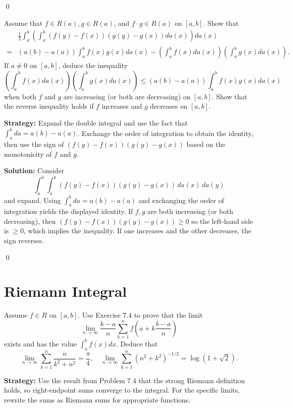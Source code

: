 \qed
\begin{problembox}
Assume that $f \in R(a), g \in R(a)$, and $f \cdot g \in R(a)$ on $[a, b]$. Show that
\begin{align*}
&\frac{1}{2} \int_a^b \left( \int_a^b (f(y) - f(x))(g(y) - g(x)) da(x) \right) da(x) \\
=& (a(b) - a(a)) \int_a^b f(x)g(x) da(x) - \left( \int_a^b f(x) da(x) \right) \left( \int_a^b g(x) da(x) \right).
\end{align*}
If $a \neq 0$ on $[a, b]$, deduce the inequality
\[\left( \int_a^b f(x) da(x) \right) \left( \int_a^b g(x) da(x) \right) \leq (a(b) - a(a)) \int_a^b f(x)g(x) da(x)\]
when both $f$ and $g$ are increasing (or both are decreasing) on $[a, b]$. Show that the reverse inequality holds if $f$ increases and $g$ decreases on $[a, b]$.
\end{problembox}

\noindent\textbf{Strategy:} Expand the double integral and use the fact that $\int_a^b da = a(b) - a(a)$. Exchange the order of integration to obtain the identity, then use the sign of $(f(y) - f(x))(g(y) - g(x))$ based on the monotonicity of $f$ and $g$.

\bigskip\noindent\textbf{Solution:}
Consider
\[\int_a^b\int_a^b (f(y)-f(x))(g(y)-g(x))\,da(x)\,da(y)\]
and expand. Using $\int_a^b da=a(b)-a(a)$ and exchanging the order of integration yields the displayed identity. If $f,g$ are both increasing (or both decreasing), then $(f(y)-f(x))(g(y)-g(x))\ge0$ so the left-hand side is $\ge0$, which implies the inequality. If one increases and the other decreases, the sign reverses.


\qed
\section{Riemann Integral}



\begin{problembox}
Assume $f \in R$ on $[a, b]$. Use Exercise 7.4 to prove that the limit 
\[\lim_{n \to \infty} \frac{b - a}{n} \sum_{k=1}^{n} f \left( a + k \frac{b - a}{n} \right)\]
exists and has the value $\int_a^b f(x) dx$. Deduce that 
\[\lim_{n \to \infty} \sum_{k=1}^{n} \frac{n}{k^2 + n^2} = \frac{\pi}{4}, \quad \lim_{n \to \infty} \sum_{k=1}^{n} (n^2 + k^2)^{-1/2} = \log (1 + \sqrt{2}).\]
\end{problembox}

\noindent\textbf{Strategy:} Use the result from Problem 7.4 that the strong Riemann definition holds, so right-endpoint sums converge to the integral. For the specific limits, rewrite the sums as Riemann sums for appropriate functions.

